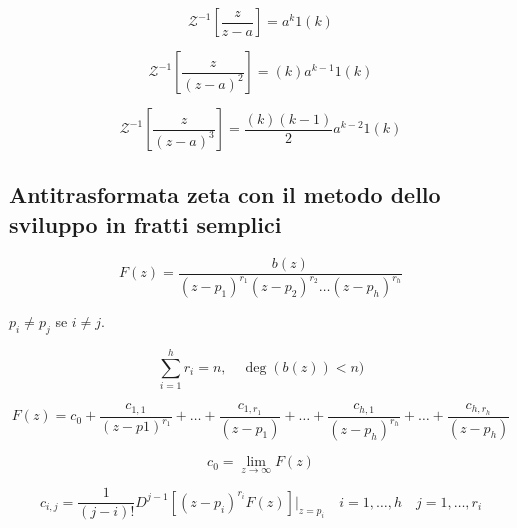 \begin{equation}
  \mathcal{Z}^{-1} \left[ \frac{z}{z-a} \right] = a^{k} 1(k)
\end{equation}

\begin{equation}
  \mathcal{Z}^{-1} \left[ \frac{z}{(z-a)^2} \right] = (k) a^{k-1} 1(k)
\end{equation}

\begin{equation}
  \mathcal{Z}^{-1} \left[ \frac{z}{(z-a)^3} \right] = \frac{(k)(k-1)}{2} a^{k-2} 1(k)
\end{equation}



\subsection{Antitrasformata zeta con il metodo dello sviluppo in fratti semplici}

\begin{equation}
  F(z) = \frac{
    b(z)
  }{
    (z - p_1)^{r_1} (z - p_2)^{r_2} \dots (z - p_h)^{r_h}
  }
\end{equation}

$p_i \neq p_j$ se $i \neq j$.


\begin{equation}
  \sum_{i=1}^{h} r_i = n, \quad \deg(b(z)) < n)
\end{equation}

\begin{equation}
  F(z) = c_0 + \frac{c_{1,1}}{(z-p1)^{r_1}} + \dots + \frac{c_{1,r_1}}{(z-p_1)} + \dots + \frac{c_{h,1}}{(z-p_h)^{r_h}} + \dots + \frac{c_{h,r_h}}{(z-p_h)}
\end{equation}

\begin{equation}
  c_0 = \lim_{z \to \infty} F(z)
\end{equation}


\begin{equation}
  c_{i, j} = \frac{1}{
    (j-i)!
  } D^{j-1} \left[ (z-p_i)^{r_i} F(z) \right] |_{z=p_i} \quad i = 1, \dots, h \quad j = 1, \dots, r_i
\end{equation}

